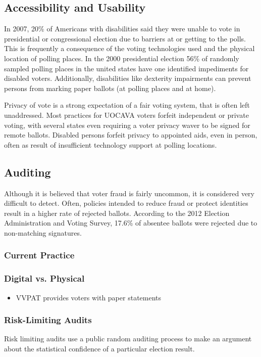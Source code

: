 
\subsection{Accessibility and Usability}

In 2007, 20\% of Americans with disabilities said they were unable to vote in presidential or congressional election due to barriers at or getting to the polls. This is frequently a consequence of the voting technologies used and the physical location of polling places. In the 2000 presidential election 56\% of randomly sampled polling places in the united states have one identified impediments for disabled voters. Additionally, disabilities like dexterity impairments can prevent persons from marking paper ballots (at polling places and at home).

Privacy of vote is a strong expectation of a fair voting system, that is often left unaddressed. Most practices for UOCAVA voters forfeit independent or private voting, with several states even requiring a voter privacy waver to be signed for remote ballots. Disabled persons forfeit privacy to appointed aids, even in person, often as result of insufficient technology support at polling locations. 


\subsection{Auditing}
Although it is believed that voter fraud is fairly uncommon, it is considered very difficult to detect. Often, policies intended to reduce fraud or protect identities result in a higher rate of rejected ballots. According to the 2012 Election Administration and Voting Survey, 17.6\% of absentee ballots were rejected due to non-matching signatures.

\subsubsection{Current Practice}
\subsubsection{Digital vs. Physical}
\begin{itemize}
\item VVPAT provides voters with paper statements
\end{itemize}
\subsubsection{Risk-Limiting Audits}
Risk limiting audits use a public random auditing process to make an argument about the statistical confidence of a particular election result.
